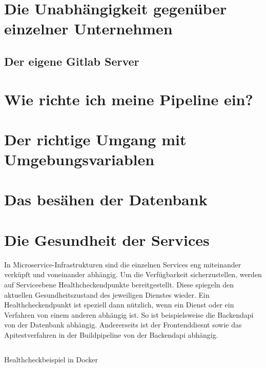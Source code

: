 \section{Die Unabhängigkeit gegenüber einzelner Unternehmen}
\subsection{Der eigene Gitlab Server}

\section{Wie richte ich meine Pipeline ein?}

\section{Der richtige Umgang mit Umgebungsvariablen}

\section{Das besähen der Datenbank}

\section{Die Gesundheit der Services}
In Microservice-Infrastrukturen sind die einzelnen Services eng miteinander verküpft
und voneinander abhängig. Um die Verfügbarkeit sicherzustellen, werden auf
Serviceebene Healthcheckendpunkte bereitgestellt. Diese spiegeln den aktuellen
Gesundheitszustand des jeweiligen Dienstes wieder. Ein Healthcheckendpunkt
ist speziell dann nützlich, wenn ein Dienst oder ein Verfahren von einem anderen
abhängig ist. So ist beispielsweise die Backendapi von der Datenbank
abhängig. Andererseits ist der Frontenddiesnt sowie das Apitestverfahren
in der Buildpipeline von der Backendapi abhängig. 

\begin{listing}
    \label{lst:healthcheck}
    \inputminted{sh}{snippets/sh/healthcheck.sh}
    \caption{Healthcheckbeispiel in Docker}
\end{listing}

